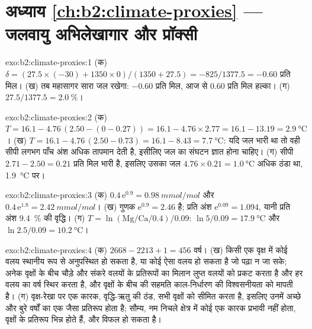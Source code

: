 \section*{अध्याय \ref{ch:b2:climate-proxies} --- जलवायु अभिलेखागार और प्रॉक्सी}

\begin{solution}{exo:b2:climate-proxies:1}
(क) $\delta = (27.5 \times (-30) + 1350 \times 0)/(1350 + 27.5) = -825/1377.5 = -0.60$ प्रति मिल।
(ख) तब महासागर सारा जल रखेगा: $-0.60$ प्रति मिल, आज से \num{0.60} प्रति मिल
हल्का। (ग) $27.5/1377.5 = \qty{2.0}{\percent}$।
\end{solution}

\begin{solution}{exo:b2:climate-proxies:2}
(क) $T = 16.1 - 4.76\,(2.50 - (0 - 0.27)) = 16.1 - 4.76 \times 2.77 = 16.1 - 13.19 =
\qty{2.9}{\celsius}$। (ख) $T = 16.1 - 4.76\,(2.50 - 0.73) = 16.1 - 8.43 = \qty{7.7}{\celsius}$: यदि
जल भारी था तो वही सीपी लगभग पाँच अंश अधिक तापमान देती है, इसीलिए
जल का संघटन ज्ञात होना चाहिए। (ग) सीपी $2.71 - 2.50 = 0.21$ प्रति मिल भारी है,
इसलिए उसका जल $4.76 \times 0.21 = \qty{1.0}{\celsius}$ अधिक ठंडा था, \qty{1.9}{\celsius} पर।
\end{solution}

\begin{solution}{exo:b2:climate-proxies:3}
(क) $0.4\,\mathrm{e}^{0.9} = \qty{0.98}{mmol/mol}$ और $0.4\,\mathrm{e}^{1.8} =
\qty{2.42}{mmol/mol}$। (ख) गुणक $\mathrm{e}^{0.9} = 2.46$ है; प्रति अंश $\mathrm{e}^{0.09}
= 1.094$, यानी प्रति अंश \qty{9.4}{\percent} की वृद्धि। (ग) $T = \ln(\text{Mg/Ca}/0.4)/0.09$:
$\ln 5/0.09 = \qty{17.9}{\celsius}$ और $\ln 2.5/0.09 = \qty{10.2}{\celsius}$।
\end{solution}

\begin{solution}{exo:b2:climate-proxies:4}
(क) $2668 - 2213 + 1 = 456$ वर्ष। (ख) किसी एक वृक्ष में कोई वलय स्थानीय रूप से अनुपस्थित हो सकता है, या कोई ऐसा वलय
हो सकता है जो पढ़ा न जा सके; अनेक वृक्षों के बीच चौड़े और संकरे वलयों के प्रतिरूपों का मिलान
लुप्त वलयों को प्रकट करता है और हर वलय का वर्ष स्थिर करता है, और वृक्षों के बीच की सहमति
काल-निर्धारण की विश्वसनीयता को मापती है। (ग) वृक्ष-रेखा पर एक कारक, वृद्धि-ऋतु की ठंड,
सभी वृक्षों को सीमित करता है, इसलिए उनमें अच्छे और बुरे वर्षों का एक जैसा प्रतिरूप होता है; सौम्य, नम
निचले क्षेत्र में कोई एक कारक प्रभावी नहीं होता, वृक्षों के प्रतिरूप भिन्न होते हैं, और  विफल हो सकता है।
\end{solution}

